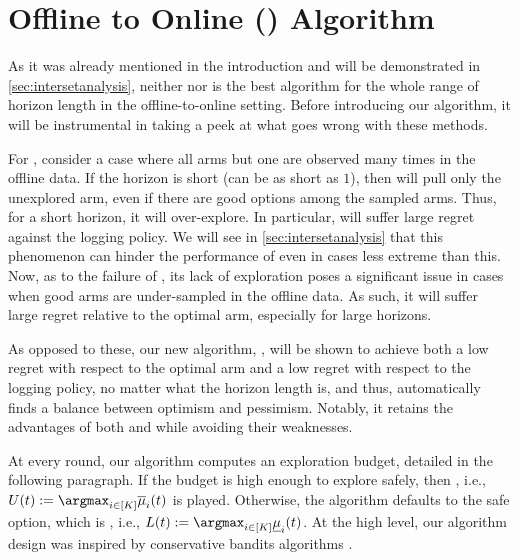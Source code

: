 
\section{Offline to Online (\algoname) Algorithm}\label{sec:algorithm}


As it was already mentioned in the introduction and will be demonstrated in \cref{sec:intersetanalysis}, neither \alglcb nor \algucb is the best algorithm for the whole range of horizon length in the offline-to-online setting. Before introducing our algorithm, it will be instrumental in taking a peek at what goes wrong with these methods.

For \algucb, consider a case where all arms but one are observed many times in the offline data. If the horizon is short (can be as short as $1$), then \algucb will pull only the unexplored arm, even if there are good options among the sampled arms. Thus, for a short horizon, it will over-explore. In particular, \algucb will suffer large regret against the logging policy. We will see in \cref{sec:intersetanalysis} that this phenomenon can hinder the performance of \algucb even in cases less extreme than this. Now, as to the failure of \alglcb, its lack of exploration poses a significant issue in cases when good arms are under-sampled in the offline data. As such, it will suffer large regret relative to the optimal arm, especially for large horizons.


As opposed to these, our new algorithm, \algoname, will be shown to achieve both a low regret with respect to the optimal arm and a low regret with respect to the logging policy, no matter what the horizon length is, and thus, automatically finds a balance between optimism and pessimism. Notably, it retains the advantages of both \alglcb and \algucb while avoiding their weaknesses.

At every round, our algorithm computes an exploration budget, detailed in the following paragraph. If the budget is high enough to explore safely, then \algucb, i.e., $U(t):= \argmax_{i \in [K]} \overline{\mu}_i(t)$  is played. Otherwise, the algorithm defaults to the safe option, which is \alglcb, i.e., $L(t):=\argmax_{i \in [K]} \underline{\mu}_i(t)$. At the high level, our algorithm design was inspired by conservative bandits algorithms \citep{wu2016conservative}. 


